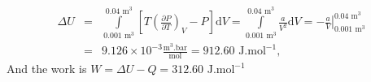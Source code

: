 \documentclass[calculator,steamtables,allquestions,datasheet]{exam_newMarcus2}
\newcommand{\frc}{\displaystyle\frac}
\renewcommand{\d}[1]{\mathrm{d} #1 }
\begin{document}
\begin{question}
\begin{enumerate}[(a)]
{       \begin{eqnarray}
         \Delta U &=& \int\limits_{0.001\text{ m}^{3}}^{0.04\text{ m}^{3}}\left[T\left(\frc{\partial P}{\partial T}\right)_{V}-P\right]\d V = \int\limits_{0.001\text{ m}^{3}}^{0.04\text{ m}^{3}} \frc{a}{V^{2}} \d V = -\left.\frc{a}{V}\right|_{0.001\text{ m}^{3}}^{0.04\text{ m}^{3}} \nonumber \\
                  &=& 9.126\times 10^{-3}\frc{\text{m}^{3}.\text{bar}}{\text{mol}} = 912.60\text{ J.mol}^{-1}, \nonumber
       \end{eqnarray}
       And the work is $W= \Delta U - Q=312.60\text{ J.mol}^{-1}$~

}
%
\end{enumerate} 
%
\end{question}

\clearpage
\end{document}

